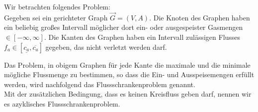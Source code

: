 Wir betrachten folgendes Problem:\\
Gegeben sei ein gerichteter Graph $\overrightarrow{G}=(V,A)$. Die Knoten des Graphen haben ein beliebig großes 
Intervall möglicher dort ein- oder ausgespeister Gasmengen $\in [-\infty, \infty]$. Die Kanten des Graphen haben ein 
Intervall zulässigen Flusses $f_a\in [\underline{c_a}, \overline{c_a}]$ gegeben, das nicht verletzt werden darf.

\begin{definition}
 Das Problem, in obigem Graphen für jede Kante die maximale und die minimale mögliche Flussmenge zu bestimmen, so dass 
die Ein- und Ausspeisemengen erfüllt werden, wird nachfolgend das Flussschrankenproblem genannt.\\
Mit der zusätzlichen Bedingung, dass es keinen Kreisfluss geben darf, nennen wir es azyklisches Flussschrankenproblem. 
\end{definition}

